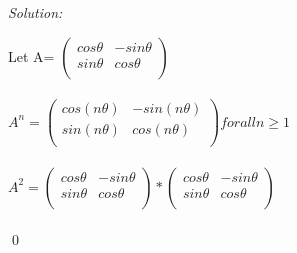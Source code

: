 \documentclass[12pt]{article}
\newenvironment{sol}
    {\emph{Solution:}
    }
    {
    \qed
    }
\begin{document}
\begin{sol}
Let A= $\left(
\begin{array}{cc}
 cos \theta  & -sin \theta  \\
 sin \theta  & cos \theta  \\
\end{array}
\right)$\\
\\

$A^{n}=\left(
\begin{array}{cc}
 cos(n\theta)  & -sin(n\theta)  \\
 sin(n\theta)  & cos(n\theta)  \\
\end{array}
\right) for  all  n\geq1 $\\
\\

$A^{2}=\left(
\begin{array}{cc}
 cos \theta  & -sin \theta  \\
 sin \theta  & cos \theta  \\
\end{array}
\right)*\left(
\begin{array}{cc}
 cos \theta  & -sin \theta  \\
 sin \theta  & cos \theta  \\
\end{array}
\right)$\\
\\


\end{sol}
\end{document}
